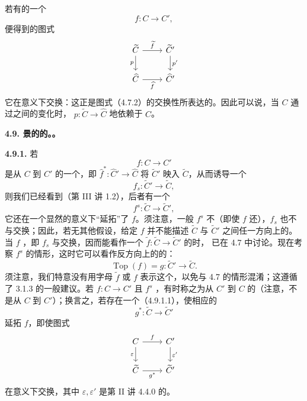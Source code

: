 若有的一个
\[
 f:C\longrightarrow C',
\]
便得到的图式
\[
\begin{tikzcd}
\widetilde C\arrow[r,"\widetilde f"]\arrow[d,"p"'] & \widetilde C'\arrow[d,"p'"]\\
\widehat C\arrow[r,"\widehat f"'] & \widehat C'
\end{tikzcd}
\]
它在意义下交换：这正是图式（4.7.2）的交换性所表达的。因此可以说，当 $C$ 通过之间的变化时， $p:\widetilde C\to\widehat C$ 地依赖于 $C$。

\textbf{4.9. 景的的。。}

\textbf{4.9.1.} 若
\[
 f:C\longrightarrow C'
\]
是从 $C$ 到 $C'$ 的一个，即 $\widehat f^*:\widehat C'\to\widehat C$ 将 $\widetilde C'$ 映入 $\widetilde C$，从而诱导一个
\[
 f_s:\widetilde C'\longrightarrow\widetilde C,
\]
则我们已经看到（第 III 讲 1.2），后者有一个
\[
 f^s:\widetilde C\longrightarrow\widetilde C',
\]
它还在一个显然的意义下“延拓”了 $f$。须注意，一般 $f^s$ 不（即使 $f$ 还），$f_s$ 也不与交换；因此，若无其他假设，给定 $f$ 并不能描述 $\widetilde C$ 与 $\widetilde C'$ 之间任一方向上的。当 $f$ ，即 $f_s$ 与交换，因而能看作一个 $\widetilde f:\widetilde C\to\widetilde C'$ 的时，
已在 4.7 中讨论。现在考察 $f^s$ 的情形，这时它可以看作反方向上的的：
\[
 \operatorname{Top}(f)=g:\widetilde C'\longrightarrow\widetilde C.\tag{4.9.1.1}
\]
须注意，我们特意没有用字母 $\widetilde f$ 或 $f$ 表示这个，以免与 4.7 的情形混淆；这遵循了 3.1.3 的一般建议。若 $f:C\to C'$ 且 $f^s$ ，有时称之为从 $C'$ 到 $C$ 的（注意，不是从 $C$ 到 $C'$）；换言之，若存在一个（4.9.1.1），使相应的
\[
 g^*:\widetilde C\longrightarrow\widetilde C'
\]
延拓 $f$，即使图式
\[
\begin{tikzcd}
 C\arrow[r,"f"]\arrow[d,"\varepsilon"'] & C'\arrow[d,"\varepsilon'"]\\
 \widetilde C\arrow[r,"g^*"'] & \widetilde C'
\end{tikzcd}
\]
在意义下交换，其中 $\varepsilon,\varepsilon'$ 是第 II 讲 4.4.0 的。

